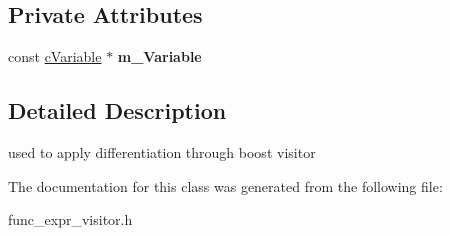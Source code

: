 \subsection*{Private Attributes}
\begin{DoxyCompactItemize}
\item 
\hypertarget{classcDiffVisitor_aa4c9ca0725e037af8b894e780046f452}{const \hyperlink{classcVariable}{c\-Variable} $\ast$ {\bfseries m\-\_\-\-Variable}}\label{classcDiffVisitor_aa4c9ca0725e037af8b894e780046f452}

\end{DoxyCompactItemize}


\subsection{Detailed Description}
used to apply differentiation through boost visitor 

The documentation for this class was generated from the following file\-:\begin{DoxyCompactItemize}
\item 
func\-\_\-expr\-\_\-visitor.\-h\end{DoxyCompactItemize}
